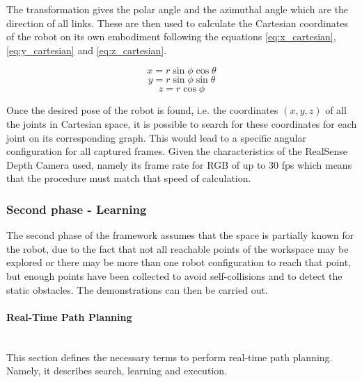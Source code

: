 \documentclass[thesis]{mas_proposal}
\begin{document}
	   	The transformation gives the polar angle and the azimuthal angle which are the direction of all links. These are then used to calculate the Cartesian coordinates of the robot on its own embodiment following the equations \ref{eq:x_cartesian}, \ref{eq:y_cartesian} and \ref{eq:z_cartesian}. 
   	
	   	\begin{equation}
	   	x = r \sin \phi \cos \theta
	   	\label{eq:x_cartesian}
	   	\end{equation}
	   	\begin{equation}
	   	y = r \sin \phi \sin \theta
	   	\label{eq:y_cartesian}
	   	\end{equation}
	   	\begin{equation}
	   	z = r \cos \phi
	   	\label{eq:z_cartesian}
	   	\end{equation}
	   	
	   	Once the desired pose of the robot is found, i.e. the coordinates $(x,y,z)$ of all the joints in Cartesian space, it is possible to search for these coordinates for each joint on its corresponding graph. This would lead to a specific angular configuration for all captured frames. Given the characteristics of the RealSense Depth Camera used, namely its frame rate for RGB of up to 30 fps \cite{realsense_manual} which means that the procedure must match that speed of calculation. 
   	
   	\subsubsection{Second phase - Learning}
   	
	The second phase of the framework assumes that the space is partially known for the robot, due to the fact that not all reachable points of the workspace may be explored or there may be more than one robot configuration to reach that point, but enough points have been collected to avoid self-collisions and to detect the static obstacles.
	The demonstrations can then be carried out. 
	
	\paragraph{Real-Time Path Planning}\mbox{} \\ [10pt]
	This section defines the necessary terms to perform real-time path planning. Namely, it describes search, learning and execution.
	
\end{document}
